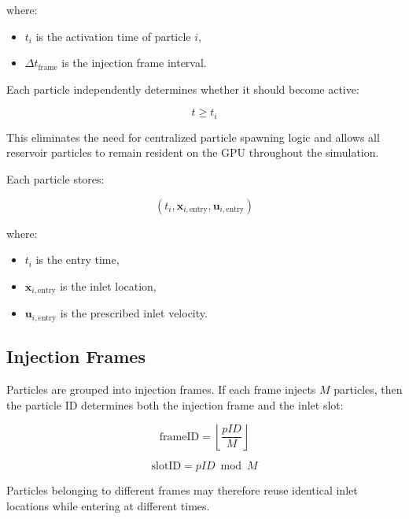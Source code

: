 \documentclass[11pt]{article}
\begin{document}
where:

\begin{itemize}
\item $t_i$ is the activation time of particle $i$,
\item $\Delta t_{\mathrm{frame}}$ is the injection frame interval.
\end{itemize}

Each particle independently determines whether it should become active:

\begin{equation}
t \ge t_i
\end{equation}

This eliminates the need for centralized particle spawning logic and allows all reservoir particles to remain resident on the GPU throughout the simulation.

Each particle stores:

\begin{equation}
\left(
t_i,
\mathbf{x}_{i,\mathrm{entry}},
\mathbf{u}_{i,\mathrm{entry}}
\right)
\end{equation}

where:

\begin{itemize}
\item $t_i$ is the entry time,
\item $\mathbf{x}_{i,\mathrm{entry}}$ is the inlet location,
\item $\mathbf{u}_{i,\mathrm{entry}}$ is the prescribed inlet velocity.
\end{itemize}

\subsection{Injection Frames}

Particles are grouped into injection frames. If each frame injects $M$ particles, then the particle ID determines both the injection frame and the inlet slot:

\begin{equation}
\mathrm{frameID}
=
\left\lfloor
\frac{pID}{M}
\right\rfloor
\end{equation}

\begin{equation}
\mathrm{slotID}
=
pID \bmod M
\end{equation}

Particles belonging to different frames may therefore reuse identical inlet locations while entering at different times.
\end{document}
